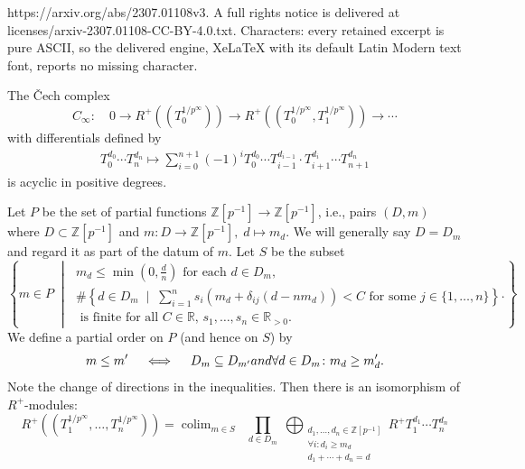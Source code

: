 \documentclass[10pt,a4paper]{amsart}
\DeclareMathOperator*{\colim}{colim}
\newcommand{\Cech}{\v{C}ech }
\newcommand{\RR}{\mathbb{R}}
\newcommand{\ZZip}{\ZZ[p^{-1}]}
\newcommand{\ZZ}{\mathbb{Z}}
\newcommand{\pRoots}{{1/p^\infty}}
\begin{document}
https://arxiv.org/abs/2307.01108v3. A full rights notice is delivered at licenses/arxiv-2307.01108-CC-BY-4.0.txt. Characters: every retained excerpt is pure ASCII, so the delivered engine, XeLaTeX with its default Latin Modern text font, reports no missing character.
\begin{mylemma}\label{KimExtCechCalculation}
    The \Cech complex
    \[C_\infty\colon \quad0 \longrightarrow R^+((T_0^{\pRoots}))\longrightarrow  R^+((T_0^{\pRoots}, T_1^{\pRoots}))\longrightarrow\cdots\]
    with differentials defined by
    \begin{align*}\tag{**}\label{KimExtDifferential}
        T_0^{d_0}\cdots T_n^{d_n}\mapsto \sum_{i=0}^{n+1} (-1)^i T_0^{d_0}\cdots T_{i-1}^{d_{i-1}}\cdot T_{i+1}^{d_i}\cdots T_{n+1}^{d_n}
    \end{align*}
    is acyclic in positive degrees.
\end{mylemma}

\begin{mylemma}\label{KimExtLaurentLemma}
    Let \(P\) be the set of partial functions \(\ZZip\to \ZZip\), i.e., pairs \((D,m)\) where \(D\subset \ZZip\) and \(m\colon D\to \ZZip, \; d\mapsto m_d\). We will generally say \(D=D_m\) and regard it as part of the datum of \(m\). Let \(S\) be the subset
    \[\left\{m\in P
    \;\middle|\;\substack{m_d\leq \min(0, \frac dn ) \text{ for each \(d\in D_m\)},\\
    \#\left\{d\in D_m \;\mid\;  \sum_{i=1}^n s_i\left(m_d + \delta_{ij}(d-nm_d)\right)<C \text{ for some } j\in \{1,\dots,n\}\right\} \\
    \text{ is finite for all \(C\in \RR\), \(s_1,\dots,s_n\in \RR_{>0}.\)}
    }
    \right\}.\]
    We define a partial order on \(P\) (and hence on \(S\)) by 
    \[m\leq m' \quad \iff \quad D_m\subseteq D_{m'} \emph{ and } \forall d\in D_m\colon m_d\geq m_d'.\]
    Note the change of directions in the inequalities. Then there is an isomorphism of \(R^+\)-modules:
    \[R^+((T_1^{\pRoots},\dots, T_n^{\pRoots}))=\colim_{m\in S} \;\;\prod_{d\in D_m}
    \;\bigoplus_{\substack{d_1,\dots,d_n\in \ZZ[p^{-1}]\\
    \forall i : d_i\geq m_d\\
    d_1+\cdots+d_n=d}}
    R^+ T_1^{d_1}\cdots T_n^{d_n}\]
\end{mylemma}
\end{document}
